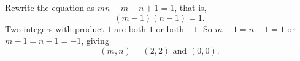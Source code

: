 Rewrite the equation as $mn-m-n+1=1$, that is,
\[(m-1)(n-1)=1.\]
Two integers with product $1$ are both $1$ or both $-1$. So $m-1=n-1=1$ or $m-1=n-1=-1$, giving
\[(m,n)=\boxed{(2,2)\text{ and }(0,0)}.\]
